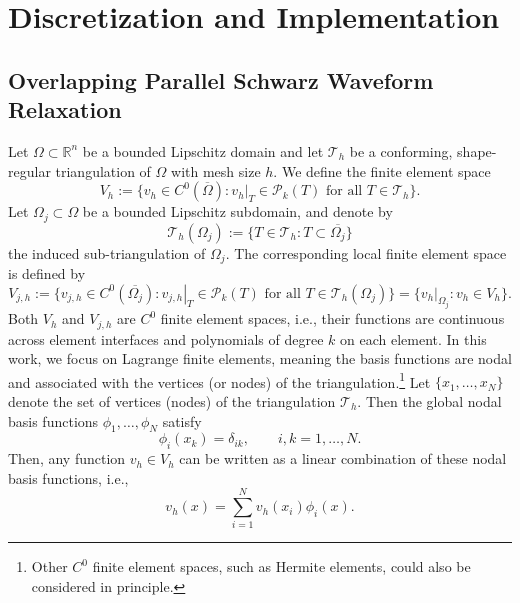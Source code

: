 \documentclass[a4paper, 11pt]{article}
\theoremstyle{remark}
\begin{document}
\section{Discretization and Implementation}
\subsection{Overlapping Parallel Schwarz Waveform Relaxation}
Let $\Omega\subset \mathbb{R}^{n}$ be a bounded Lipschitz domain and let $\mathcal{T}_{h}$ be a conforming, shape-regular triangulation of $\Omega$ with mesh size $h$. We define the finite element space
\begin{equation*}
    V_{h} := \{v_{h}\in C^{0}(\overline{\Omega}): \left.v_{h}\right|_{T}\in \mathcal{P}_{k}(T) \text{ for all } T\in \mathcal{T}_{h}\}.
\end{equation*}
Let $\Omega_{j}\subset \Omega$ be a bounded Lipschitz subdomain, and denote by
\begin{equation*}
    \mathcal{T}_{h}(\Omega_{j}) := \{T\in \mathcal{T}_{h}: T\subset \overline{\Omega_{j}}\}
\end{equation*}
the induced sub-triangulation of $\Omega_{j}$. The corresponding local finite element space is defined by
\begin{equation*}
    V_{j, h} := \{v_{j, h}\in C^{0}(\overline{\Omega_{j}}): \left.v_{j, h}\right|_{T}\in \mathcal{P}_{k}(T) \text{ for all } T\in \mathcal{T}_{h}(\Omega_{j})\} = \{\left.v_{h}\right|_{\Omega_{j}}: v_{h}\in V_{h}\}.
\end{equation*}
Both $V_{h}$ and $V_{j, h}$ are $C^{0}$ finite element spaces, i.e., their functions are continuous across element interfaces and polynomials of degree $k$ on each element. In this work, we focus on Lagrange finite elements, meaning the basis functions are nodal and associated with the vertices (or nodes) of the triangulation.\footnote{Other $C^{0}$ finite element spaces, such as Hermite elements, could also be considered in principle.} Let $\{x_{1}, \ldots, x_{N}\}$ denote the set of vertices (nodes) of the triangulation $\mathcal{T}_{h}$. Then the global nodal basis functions $\phi_{1}, \ldots, \phi_{N}$ satisfy
\begin{equation*}
    \phi_{i}(x_{k}) = \delta_{ik}, \qquad i, k = 1, \ldots, N.
\end{equation*}
Then, any function $v_{h}\in V_{h}$ can be written as a linear combination of these nodal basis functions, i.e.,
\begin{equation*}
    v_{h}(x) = \sum_{i=1}^{N}v_{h}(x_{i})\phi_{i}(x).
\end{equation*}
\end{document}
